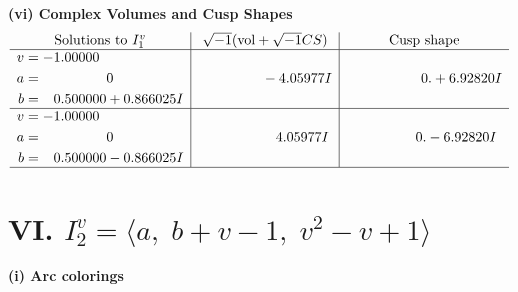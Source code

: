 \documentclass[1p]{elsarticle_modified}
\theoremstyle{definition}
\newcommand{\I}{\sqrt{-1}}
\begin{document}
\newpage\flushleft \textbf{(vi) Complex Volumes and Cusp Shapes}
$$\begin{array}{c|c|c}  
\text{Solutions to }I^v_{1}& \I (\text{vol} + \sqrt{-1}CS) & \text{Cusp shape}\\
 \hline 
\begin{aligned}
v &= -1.00000\phantom{ +0.000000I} \\
a &= \phantom{-0.000000 } 0 \\
b &= \phantom{-}0.500000 + 0.866025 I\end{aligned}
 & \phantom{-0.000000 } -4.05977 I & \phantom{-0.000000 -}0. + 6.92820 I \\ \hline\begin{aligned}
v &= -1.00000\phantom{ +0.000000I} \\
a &= \phantom{-0.000000 } 0 \\
b &= \phantom{-}0.500000 - 0.866025 I\end{aligned}
 & \phantom{-0.000000 -}4.05977 I & \phantom{-0.000000 } 0. - 6.92820 I\\
 \hline 
 \end{array}$$\newpage\newpage\renewcommand{\arraystretch}{1}
\centering \section*{VI. $I^v_{2}= \langle a,\;b+v-1,\;v^2- v+1 \rangle$}
\flushleft \textbf{(i) Arc colorings}\\
\end{document}
